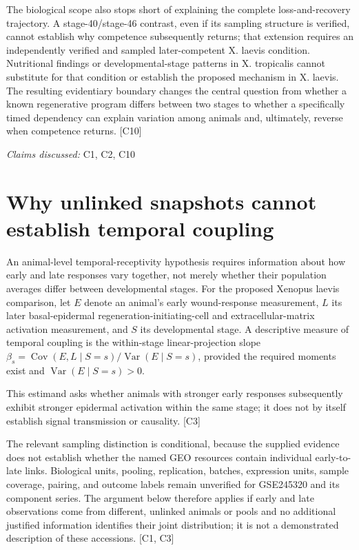 \documentclass[11pt]{article}
\begin{document}
The biological scope also stops short of explaining the complete loss-and-recovery trajectory. A stage-40/stage-46 contrast, even if its sampling structure is verified, cannot establish why competence subsequently returns; that extension requires an independently verified and sampled later-competent X. laevis condition. Nutritional findings or developmental-stage patterns in X. tropicalis cannot substitute for that condition or establish the proposed mechanism in X. laevis. The resulting evidentiary boundary changes the central question from whether a known regenerative program differs between two stages to whether a specifically timed dependency can explain variation among animals and, ultimately, reverse when competence returns. [C10]

\textit{Claims discussed: }C1, C2, C10
\section{Why unlinked snapshots cannot establish temporal coupling}
An animal-level temporal-receptivity hypothesis requires information about how early and late responses vary together, not merely whether their population averages differ between developmental stages. For the proposed Xenopus laevis comparison, let $E$ denote an animal\textquoteright{}s early wound-response measurement, $L$ its later basal-epidermal regeneration-initiating-cell and extracellular-matrix activation measurement, and $S$ its developmental stage. A descriptive measure of temporal coupling is the within-stage linear-projection slope $\beta_s=\operatorname{Cov}(E,L\mid S=s)/\operatorname{Var}(E\mid S=s)$, provided the required moments exist and $\operatorname{Var}(E\mid S=s)>0$.

This estimand asks whether animals with stronger early responses subsequently exhibit stronger epidermal activation within the same stage; it does not by itself establish signal transmission or causality. [C3]

The relevant sampling distinction is conditional, because the supplied evidence does not establish whether the named GEO resources contain individual early-to-late links. Biological units, pooling, replication, batches, expression units, sample coverage, pairing, and outcome labels remain unverified for GSE245320 and its component series. The argument below therefore applies if early and late observations come from different, unlinked animals or pools and no additional justified information identifies their joint distribution; it is not a demonstrated description of these accessions. [C1, C3]
\end{document}
